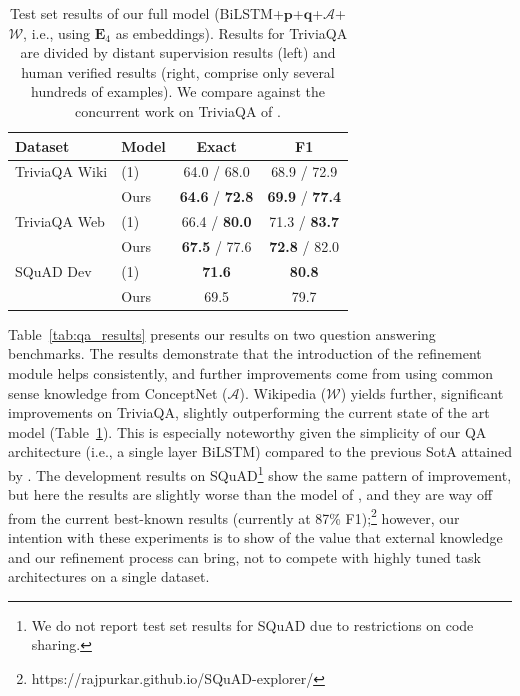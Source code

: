 \documentclass[11pt,a4paper]{article}
\begin{document}
\begin{table}[t]
    \small
    \centering
        \begin{tabular}{l l c c}
        \toprule
            \textbf{Dataset} & \textbf{Model} & \textbf{Exact} & \textbf{F1} \\
            \midrule
            TriviaQA Wiki & (1) & 64.0 / 68.0 & 68.9 / 72.9 \\ 
             & Ours & \textbf{64.6} / \textbf{72.8} & \textbf{69.9} / \textbf{77.4} \\
            \midrule
            TriviaQA Web & (1) & 66.4 / \textbf{80.0} & 71.3 / \textbf{83.7} \\ 
             & Ours & \textbf{67.5} / 77.6 &	\textbf{72.8} / 82.0  \\
            \midrule
            SQuAD Dev & (1) & \textbf{71.6} & \textbf{80.8} \\ 
                & Ours & 69.5 & 79.7 \\ 
            \bottomrule
        \end{tabular}
        \caption{Test set results of our full model (BiLSTM+$\boldsymbol{p}$+$\boldsymbol{q}$+$\mathcal{A}$+$\mathcal{W}$, i.e., using $\mathbf{E}_4$ as embeddings). Results for TriviaQA are divided by distant supervision results (left) and human verified results (right, comprise only several hundreds of examples). We compare against the concurrent work on TriviaQA of .}\label{tab:qa_test_results}
\end{table}

Table~\ref{tab:qa_results} presents our results on two question answering benchmarks. The results demonstrate that the introduction of the refinement module helps consistently, and further improvements come from using common sense knowledge from ConceptNet ($\mathcal{A}$). Wikipedia ($\mathcal{W}$) yields further, significant improvements on TriviaQA, slightly outperforming the current state of the art model (Table~\ref{tab:qa_test_results}). This is especially noteworthy given the simplicity of our QA architecture (i.e., a single layer BiLSTM) compared to the previous SotA attained by . The development results on SQuAD\footnote{We do not report test set results for SQuAD due to restrictions on code sharing.} show the same pattern of improvement, but here the results are slightly worse than the model of , and they are way off from the current best-known results (currently at 87\% F1);\footnote{https://rajpurkar.github.io/SQuAD-explorer/} however, our intention with these experiments is to show of the value that external knowledge and our refinement process can bring, not to compete with highly tuned task architectures on a single dataset.
\end{document}
